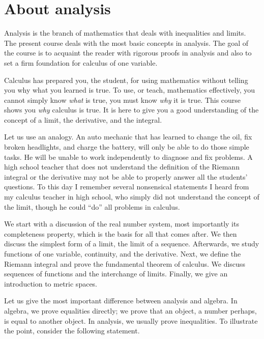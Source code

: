 \documentclass[12pt]{book}
\newcommand{\sectionnewpage}{\clearpage}
\theoremstyle{plain}
\theoremstyle{remark}
\theoremstyle{definition}
\theoremstyle{exercise}
\theoremstyle{example}
\begin{document}

\sectionnewpage
\section{About analysis} \label{sec:aboutra}

Analysis is the branch of mathematics that deals with inequalities and
limits.  The present course deals with the most basic 
concepts in analysis.  The goal of the course is to acquaint the reader
with rigorous proofs in analysis and also to
set a firm foundation for calculus of one variable.

Calculus has prepared you, the student, for using mathematics without telling
you why what you learned is true.  To use, or teach, mathematics
effectively, you cannot simply know \emph{what} is true, you must know
\emph{why} it is true.  This course shows you \emph{why} calculus
is true.  It is here to give you a good understanding of the concept of a
limit, the derivative, and the integral.

Let us use an analogy.
An auto mechanic that has learned to change the oil, fix broken headlights,
and charge the battery, will only be able to do those simple tasks.  He
will be unable to work independently to diagnose and fix problems.
A high school teacher that does not understand the definition of the Riemann
integral or the derivative may not be able to properly answer all the
students' questions.
To this day I remember several nonsensical statements I heard
from my calculus teacher in high school, who simply did not understand
the concept of the limit, though he could ``do'' all problems in calculus.

\medskip

We start with a discussion of the real number system, most importantly
its completeness property, which is the basis for all that comes after.
We then discuss the simplest form of a limit,
the limit of a sequence.  Afterwards, we study
functions of one variable, continuity, and the derivative.
Next, we define the Riemann integral and prove the fundamental theorem of
calculus.  We discuss sequences of functions and the
interchange of limits.  Finally, we give an introduction to metric
spaces.

Let us give the most important difference between analysis and
algebra.  In algebra, we prove equalities directly; we prove that
an object, a number perhaps, is equal to another object.  In analysis,
we usually prove inequalities.  To illustrate the point, consider the
following statement.
\end{document}

